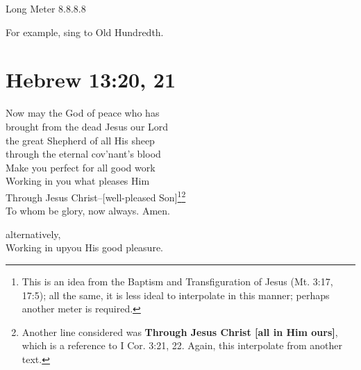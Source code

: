 \documentclass{article}
\begin{document}
\noindent Long Meter 8.8.8.8

\noindent For example, sing to Old Hundredth.

\section*{Hebrew 13:20, 21}

 Now may the God of peace who has\\
brought from the dead Jesus our Lord\\
the great Shepherd of all His sheep\\
through the eternal cov'nant's blood\\

 Make you perfect for all good work\\
Working in you what pleases Him\\
Through Jesus Christ--[well-pleased Son]\footnote{This is an idea from the Baptism and Transfiguration of Jesus (Mt. 3:17, 17:5); all the same, it is less ideal to interpolate in this manner; perhaps another meter is required.}\footnote{Another line considered was \textbf{Through Jesus Christ [all in Him ours]}, which is a reference to I Cor. 3:21, 22. Again, this interpolate from another text.}\\
To whom be glory, now always. Amen.


alternatively,\\

Working in upyou His good pleasure.
\end{document}
